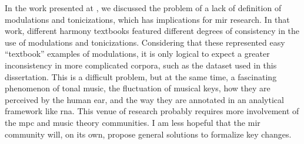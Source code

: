 
In the work presented at \textcite{napoleslopez2020local},
we discussed the problem of a lack of definition of
modulations and tonicizations, which has implications for
\gls{mir} research. In that work, different harmony
textbooks featured different degrees of consistency in the
use of modulations and tonicizations. Considering that these
represented  easy ``textbook'' examples of modulations, it
is only logical to expect a greater inconsistency in more
complicated corpora, such as the dataset used in this
dissertation. This is a difficult problem, but at the same
time, a fascinating phenomenon of tonal music, the
fluctuation of musical keys, how they are perceived by the
human ear, and the way they are annotated in an analytical
framework like \gls{rna}. This venue of research probably
requires more involvement of the \gls{mpc} and music theory
communities. I am less hopeful that the \gls{mir} community
will, on its own, propose general solutions to formalize key
changes.

